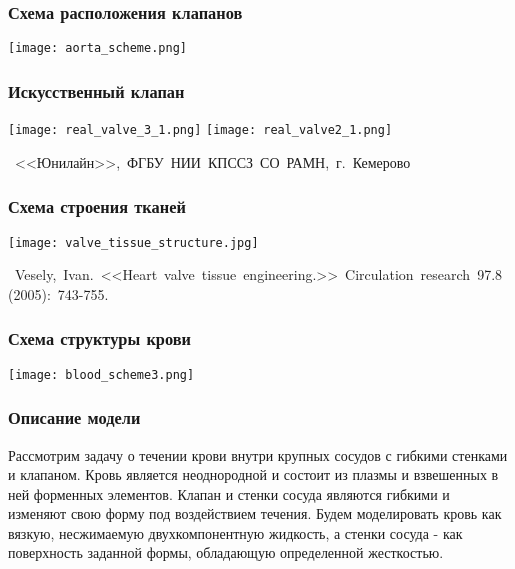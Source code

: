 \documentclass[14pt]{beamer}
\begin{document}
\begin{frame}
\frametitle{Схема расположения клапанов}
    \begin{center}
        \texttt{[image: aorta\_scheme.png]}
    \end{center}
\end{frame}

\begin{frame}
\frametitle{Искусственный клапан}
    \begin{center}
        \vspace{1.0cm}
        \texttt{[image: real\_valve\_3\_1.png]}
        \texttt{[image: real\_valve2\_1.png]}

        \vspace{1.1cm}
        \mbox{\scriptsize
            <<Юнилайн>>, ФГБУ НИИ КПССЗ СО РАМН, г. Кемерово
        }
    \end{center}
\end{frame}

\begin{frame}
\frametitle{Схема строения тканей}
    \begin{center}
        \texttt{[image: valve\_tissue\_structure.jpg]}
    \end{center}

    \begin{spacing}{0.5}
        \mbox{\scriptsize
            Vesely, Ivan. <<Heart valve tissue engineering.>> Circulation research 97.8 (2005): 743-755.
        }
    \end{spacing}

\end{frame}

\begin{frame}
\frametitle{Схема структуры крови}
    \begin{center}
        \texttt{[image: blood\_scheme3.png]}
    \end{center}
\end{frame}

\begin{frame}
\frametitle{Описание модели}
Рассмотрим задачу о течении крови внутри крупных сосудов с гибкими стенками и клапаном. Кровь является неоднородной и состоит из плазмы и взвешенных в ней форменных элементов. Клапан и стенки сосуда являются гибкими и изменяют свою форму под воздействием течения. Будем моделировать кровь как вязкую, несжимаемую двухкомпонентную жидкость, а стенки сосуда - как поверхность заданной формы, обладающую определенной жесткостью.
\end{frame}
\end{document}
